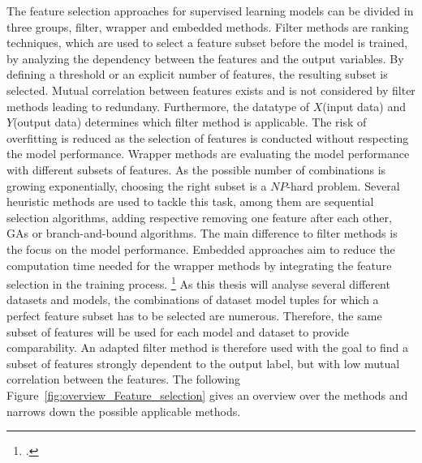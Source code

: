 The feature selection approaches for supervised learning models can be divided in three groups, filter, wrapper and embedded methods.
Filter methods are ranking techniques, which are used to select a feature subset before the model is trained, by analyzing
the dependency between the features and the output variables. By defining a threshold or an explicit number of features, the
resulting subset is selected. Mutual correlation between features exists and is not considered by filter methods
leading to redundany. Furthermore, the datatype of $X$(input data) and $Y$(output data) determines which filter method is applicable. The risk
of overfitting is reduced as the selection of features is conducted without respecting the model performance.
Wrapper methods are evaluating the model performance with different subsets of features. As the possible number of combinations is growing
exponentially, choosing the right subset is a $NP$-hard problem. Several heuristic methods are used to tackle this task, among them
are sequential selection algorithms, adding respective removing one feature after each other,
\glspl{GA} or branch-and-bound algorithms. The main difference to filter methods is the focus on the model performance.
Embedded approaches aim to reduce the computation time needed for the wrapper methods by integrating the
feature selection in the training process. \footcites[cf.][pp.17-21]{chandrashekar_survey_2014} As this thesis will analyse several
different datasets and models, the combinations of dataset model tuples for which a perfect feature subset
has to be selected are numerous. Therefore, the same subset of features will be used for each model and dataset to provide comparability.
An adapted filter method is therefore used with the goal to find a subset of features strongly dependent
to the output label, but with low mutual correlation between the features. The following Figure~\ref{fig:overview_Feature_selection}
gives an overview over the methods and narrows down the possible applicable methods.



